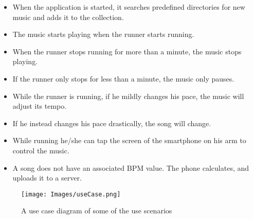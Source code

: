 \begin{itemize}
	\item When the application is started, it searches predefined directories for new music and adds it to the collection.
	\item The music starts playing when the runner starts running.
	\item When the runner stops running for more than a minute, the music stops playing.
	\item If the runner only stops for less than a minute, the music only pauses.
	\item While the runner is running, if he mildly changes his pace, the music will adjust its tempo.
	\item If he instead changes his pace drastically, the song will change.
	\item While running he/she can tap the screen of the smartphone on his arm to control the music.
	\item A song does not have an associated BPM value. The phone calculates, and uploads it to a server.
\end{itemize}

\begin{figure}[h!]
  \caption{A use case diagram of some of the use scenarios}
  \centering
    \texttt{[image: Images/useCase.png]}
\end{figure}

